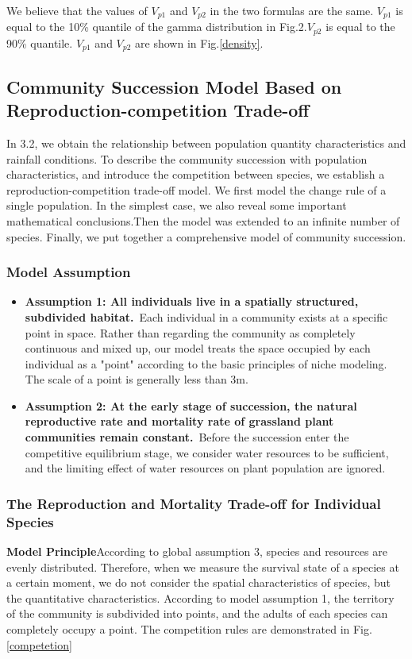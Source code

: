 \documentclass{mcmthesis}
\begin{document}
We believe that the values of $V_{p1}$ and $V_{p2}$ in the two formulas are the same. $V_{p1}$ is equal to the 10\% quantile of the gamma distribution in Fig.2.$V_{p2}$ is equal to the 90\% quantile. $V_{p1}$ and $V_{p2}$ are shown in Fig.\ref{density}.


\subsection{Community Succession Model Based on Reproduction-competition Trade-off}
In 3.2, we obtain the relationship between population quantity characteristics and rainfall conditions. To describe the community succession with population characteristics, and introduce the competition between species, we establish a reproduction-competition trade-off model. We first model the change rule of a single population. In the simplest case, we also reveal some important mathematical conclusions.Then the model was extended to an infinite number of species. Finally, we put together a comprehensive model of community succession.

\subsubsection{Model Assumption}

\begin{itemize}
	\item \textbf{Assumption 1: All individuals live in a spatially structured, subdivided habitat. }\,Each individual in a community exists at a specific point in space. Rather than regarding the community as completely continuous and mixed up, our model treats the space occupied by each individual as a "point" according to the basic principles of niche modeling. The scale of a point is generally less than 3m.
	
	\item \textbf{Assumption 2: At the early stage of succession, the natural reproductive rate and mortality rate of  grassland plant communities remain constant. }\,Before the succession enter the competitive equilibrium stage, we consider water resources to be sufficient, and the limiting effect of water resources on plant population are ignored.
	
\end{itemize}

\subsubsection{The Reproduction and Mortality Trade-off for Individual Species}
\textbf{Model Principle}\quad According to global assumption 3, species and resources are evenly distributed. Therefore, when we measure the survival state of a species at a certain moment, we do not consider the spatial characteristics of species, but the quantitative characteristics. According to model assumption 1, the territory of the community is subdivided into points, and the adults of each species can completely occupy a point. The competition rules are demonstrated in Fig. \ref{competetion} 
\end{document}
